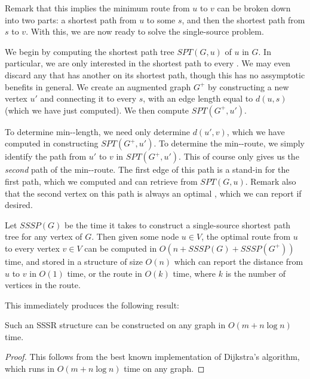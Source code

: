 \documentclass{cccg13}
\begin{document}
Remark that this implies the minimum \supplied{} route from $u$ to $v$ can be broken down into two parts: a shortest path from $u$ to some \supplier{} $s$, and then the shortest path from $s$ to $v$. With this, we are now ready to solve the single-source problem.

We begin by computing the shortest path tree $SPT(G,u)$ of $u$ in $G$. In particular, we are only interested in the shortest path to every \supplier{}. We may even discard any \supplier{} that has another \supplier{} on its shortest path, though this has no assymptotic benefits in general. We create an augmented graph $G^+$ by constructing a new vertex $u'$ and connecting it to every \supplier{} $s$, with an edge length equal to $d(u,s)$ (which we have just computed). We then compute $SPT(G^+,u')$. 

To determine min-\supplied{}-length, we need only determine $d(u',v)$, which we have computed in constructing $SPT(G^+,u')$. To determine the min-\supplied{}-route, we simply identify the path from $u'$ to $v$ in $SPT(G^+,u')$. This of course only gives us the \emph{second} path of the min-\supplied{}-route. The first edge of this path is a stand-in for the first path, which we computed and can retrieve from $SPT(G,u)$. Remark also that the second vertex on this path is always an optimal \supplier{}, which we can report if desired.

\begin{theorem}
    Let $SSSP(G)$ be the time it takes to construct a single-source shortest path tree for any vertex of $G$. Then given some node $u \in V$, the optimal \supplied{} route from $u$ to every vertex $v \in V$ can be computed in $O(n + SSSP(G) + SSSP(G^+))$ time, and stored in a structure of size $O(n)$ which can report the \supplied{} distance from $u$ to $v$ in $O(1)$ time, or the \supplied{} route in $O(k)$ time, where $k$ is the number of vertices in the route.
\end{theorem}

This immediately produces the following result:

\begin{cor}
    Such an SSSR structure can be constructed on any graph in $O(m + n\log n)$ time.
\end{cor}

\begin{proof}
    This follows from the best known implementation of Dijkstra's algorithm, which runs in $O(m + n\log n)$ time on any graph.
\end{proof}
\end{document}
